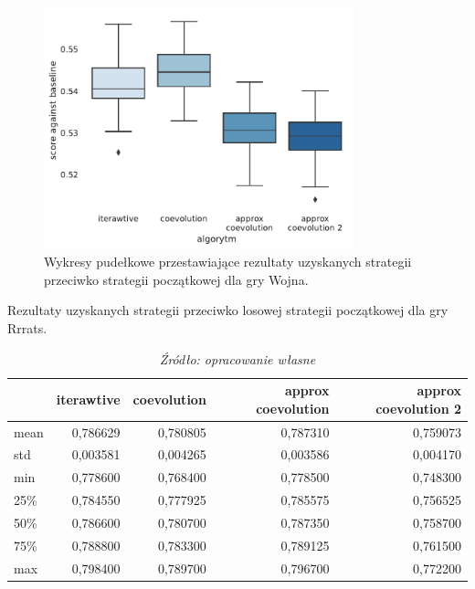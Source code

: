 \documentclass[inzynierska]{pwr_wmat_praca_dyplomowa}
\theoremstyle{plain}
\numberwithin{theorem}{chapter}
\theoremstyle{definition}
\numberwithin{theorem}{chapter}
\begin{document}
	\begin{figure}
		\centering
		\includegraphics[width=0.8\textwidth]{imagens/war_results.pdf}
		\caption{Wykresy pudełkowe przestawiające rezultaty uzyskanych strategii przeciwko strategii początkowej dla gry Wojna.}
		\label{fig:war_results}
	\end{figure}
\begin{table}
	\begin{center}
		\caption{Rezultaty uzyskanych strategii przeciwko losowej strategii początkowej dla gry Rrrats.}
		\small
		\begin{tabular}{lrrrr}
			\toprule
			{} &  iterawtive &  coevolution &  approx coevolution &  approx coevolution 2 \\
			\midrule
			mean  &    0,786629 &     0,780805 &             0,787310 &               0,759073 \\
			std   &    0,003581 &     0,004265 &             0,003586 &               0,004170 \\
			min   &    0,778600 &     0,768400 &             0,778500 &               0,748300 \\
			25\%   &    0,784550 &     0,777925 &             0,785575 &               0,756525 \\
			50\%   &    0,786600 &     0,780700 &             0,787350 &               0,758700 \\
			75\%   &    0,788800 &     0,783300 &             0,789125 &               0,761500 \\
			max   &    0,798400 &     0,789700 &             0,796700 &               0,772200 \\
			\bottomrule
		\end{tabular}
		\caption*{\textit{Źródło: opracowanie własne}}
		
		\label{table:rrrats_results}
		\end{center}
	\end{table}
\end{document}
